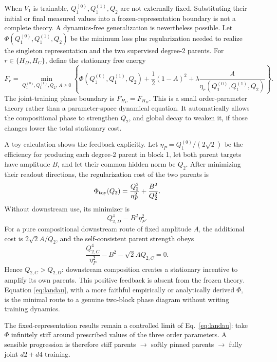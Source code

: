 \documentclass[11pt]{article}
\begin{document}
When \(V_1\) is trainable, \(Q_1^{(0)},Q_1^{(1)},Q_2\) are not externally fixed.  Substituting
their initial or final measured values into a frozen-representation boundary is not a complete
theory.  A dynamics-free generalization is nevertheless possible.  Let
\(\Phi(Q_1^{(0)},Q_1^{(1)},Q_2)\) be the minimum loss plus regularization needed to realize the
singleton representation and the two supervised degree-2 parents.  For
\(r\in\{H_D,H_C\}\), define the stationary free energy
\begin{equation}
\boxed{
F_r=\min_{Q_1^{(0)},Q_1^{(1)},Q_2,\,A\geq0}
\left\{
\Phi(Q_1^{(0)},Q_1^{(1)},Q_2)
+\frac12(1-A)^2
+\lambda\frac{A}{\eta_r(Q_1^{(0)},Q_1^{(1)},Q_2)}
\right\}.}
\label{eq:landau}
\end{equation}
The joint-training phase boundary is \(F_{H_C}=F_{H_D}\).  This is a small order-parameter
theory rather than a parameter-space dynamical equation.  It automatically allows the
compositional phase to strengthen \(Q_2\), and global decay to weaken it, if those changes lower
the total stationary cost.

A toy calculation shows the feedback explicitly.  Let
\(\eta_P=Q_1^{(0)}/(2\sqrt2)\) be the efficiency for producing each degree-2 parent in block 1,
let both parent targets have amplitude \(B\), and let their common hidden norm be \(Q_2\).
After minimizing their readout directions, the regularization cost of the two parents is
\begin{equation}
\Phi_{\rm toy}(Q_2)=\frac{Q_2^2}{\eta_P^2}+\frac{B^2}{Q_2^2}.
\label{eq:parent-potential}
\end{equation}
Without downstream use, its minimizer is
\begin{equation}
Q_{2,D}^4=B^2\eta_P^2.
\end{equation}
For a pure compositional downstream route of fixed amplitude \(A\), the additional cost is
\(2\sqrt2 A/Q_2\), and the self-consistent parent strength obeys
\begin{equation}
\boxed{
\frac{Q_{2,C}^4}{\eta_P^2}-B^2-\sqrt2 A Q_{2,C}=0.}
\label{eq:self-consistent-q2}
\end{equation}
Hence \(Q_{2,C}>Q_{2,D}\): downstream composition creates a stationary incentive to amplify
its own parents.  This positive feedback is absent from the frozen theory.  Equation
\eqref{eq:landau}, with a more faithful empirically or analytically derived \(\Phi\), is the
minimal route to a genuine two-block phase diagram without writing training dynamics.

The fixed-representation results remain a controlled limit of
Eq.~\eqref{eq:landau}: take \(\Phi\) infinitely stiff around prescribed values of the three
order parameters.  A sensible progression is therefore stiff parents \(\to\) softly pinned
parents \(\to\) fully joint \(d2+d4\) training.
\end{document}
